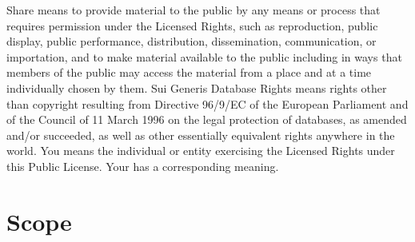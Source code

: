     Share means to provide material to the public by any means or process that requires permission under the Licensed Rights, such as reproduction, public display, public performance, distribution, dissemination, communication, or importation, and to make material available to the public including in ways that members of the public may access the material from a place and at a time individually chosen by them.
    Sui Generis Database Rights means rights other than copyright resulting from Directive 96/9/EC of the European Parliament and of the Council of 11 March 1996 on the legal protection of databases, as amended and/or succeeded, as well as other essentially equivalent rights anywhere in the world.
    You means the individual or entity exercising the Licensed Rights under this Public License. Your has a corresponding meaning.

\section*{Scope}

